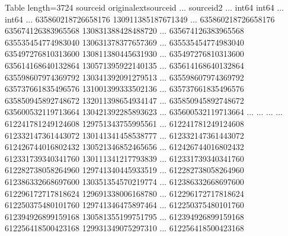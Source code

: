 \documentclass[letterpaper,10pt,english]{sphinxmanual}
\begin{document}
\begin{sphinxVerbatim}[commandchars=\\\{\}]
  
\end{sphinxVerbatim}

\begin{sphinxVerbatim}[commandchars=\\\{\}]
\PYGZlt{}Table length=3724\PYGZgt{}
    source\PYGZus{}id      original\PYGZus{}ext\PYGZus{}source\PYGZus{}id ...    source\PYGZus{}id\PYGZus{}2    
                                          ...                   
      int64                int64          ...       int64       
\PYGZhy{}\PYGZhy{}\PYGZhy{}\PYGZhy{}\PYGZhy{}\PYGZhy{}\PYGZhy{}\PYGZhy{}\PYGZhy{}\PYGZhy{}\PYGZhy{}\PYGZhy{}\PYGZhy{}\PYGZhy{}\PYGZhy{}\PYGZhy{}\PYGZhy{}\PYGZhy{} \PYGZhy{}\PYGZhy{}\PYGZhy{}\PYGZhy{}\PYGZhy{}\PYGZhy{}\PYGZhy{}\PYGZhy{}\PYGZhy{}\PYGZhy{}\PYGZhy{}\PYGZhy{}\PYGZhy{}\PYGZhy{}\PYGZhy{}\PYGZhy{}\PYGZhy{}\PYGZhy{}\PYGZhy{}\PYGZhy{}\PYGZhy{}\PYGZhy{} ... \PYGZhy{}\PYGZhy{}\PYGZhy{}\PYGZhy{}\PYGZhy{}\PYGZhy{}\PYGZhy{}\PYGZhy{}\PYGZhy{}\PYGZhy{}\PYGZhy{}\PYGZhy{}\PYGZhy{}\PYGZhy{}\PYGZhy{}\PYGZhy{}\PYGZhy{}\PYGZhy{}
635860218726658176     130911385187671349 ... 635860218726658176
635674126383965568     130831388428488720 ... 635674126383965568
635535454774983040     130631378377657369 ... 635535454774983040
635497276810313600     130811380445631930 ... 635497276810313600
635614168640132864     130571395922140135 ... 635614168640132864
635598607974369792     130341392091279513 ... 635598607974369792
635737661835496576     131001399333502136 ... 635737661835496576
635850945892748672     132011398654934147 ... 635850945892748672
635600532119713664     130421392285893623 ... 635600532119713664
               ...                    ... ...                ...
612241781249124608     129751343755995561 ... 612241781249124608
612332147361443072     130141341458538777 ... 612332147361443072
612426744016802432     130521346852465656 ... 612426744016802432
612331739340341760     130111341217793839 ... 612331739340341760
612282738058264960     129741340445933519 ... 612282738058264960
612386332668697600     130351354570219774 ... 612386332668697600
612296172717818624     129691338006168780 ... 612296172717818624
612250375480101760     129741346475897464 ... 612250375480101760
612394926899159168     130581355199751795 ... 612394926899159168
612256418500423168     129931349075297310 ... 612256418500423168
\end{sphinxVerbatim}
\end{document}
